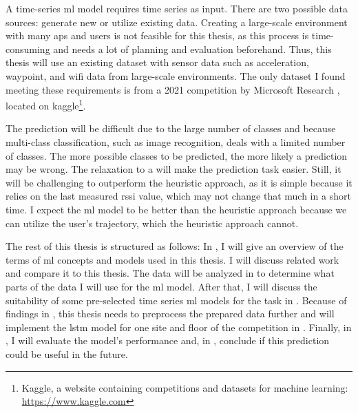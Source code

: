 A time-series \ac{ml} model requires time series as input.
There are two possible data sources: generate new or utilize existing data. 
Creating a large-scale environment with many \acp{ap} and users is not feasible for this thesis, as this process is time-consuming and needs a lot of planning and evaluation beforehand.
Thus, this thesis will use an existing dataset with sensor data such as acceleration, waypoint, and \ac{wifi} data from large-scale environments.
The only dataset I found meeting these requirements is from a 2021 competition by Microsoft Research \cite{IndoorLocationNavigation}, located on kaggle\footnote{Kaggle, a website containing competitions and datasets for machine learning: \url{https://www.kaggle.com}}.

The prediction will be difficult due to the large number of classes and because multi-class classification, such as image recognition, deals with a limited number of classes.
The more possible classes to be predicted, the more likely a prediction may be wrong.
The relaxation to a \threeAP will make the prediction task easier.
Still, it will be challenging to outperform the heuristic approach, as it is simple because it relies on the last measured \ac{rssi} value, which may not change that much in a short time. 
I expect the \ac{ml} model to be better than the heuristic approach because we can utilize the user's trajectory, which the heuristic approach cannot.

The rest of this thesis is structured as follows:
In , I will give an overview of the terms of \ac{ml} concepts and models used in this thesis.
 I will discuss related work and compare it to this thesis.
The data will be analyzed in  to determine what parts of the data I will use for the \ac{ml} model.
After that, I will discuss the suitability of some pre-selected time series \ac{ml} models for the task in . 
Because of findings in , this thesis needs to preprocess the prepared data further and will implement the \ac{lstm} model for one site and floor of the competition in .
Finally, in , I will evaluate the model's performance and, in , conclude if this prediction could be useful in the future.
